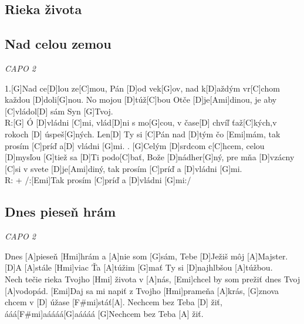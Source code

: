 \documentclass[10pt]{article}
\begin{document}
\begin{Large}
\newpage

\begin{minipage}{\textwidth}
\section{Rieka života}
\subsection{Nad celou zemou}
\textit{CAPO 2}
\begin{multicols*}{2}
\begin{guitar}	
	1.[G]Nad ce[D]lou ze[C]mou, Pán [D]od vek[G]ov,
	nad k[D]aždým vr[C]chom každou [D]doli[G]nou.
	No mojou [D]túž[C]bou Otče [D]je[Ami]dinou,
	je aby [C]vládol[D] sám Syn [G]Tvoj.
	\\
	R:[G] Ó [D]vládni [C]mi, vlád[D]ni s mo[G]cou,
	v čase[D] chvíľ ťaž[C]kých,v rokoch [D] úspeš[G]ných.
	Len[D] Ty si [C]Pán nad [D]tým čo [Emi]mám,
	tak prosím [C]príď a[D] vládni [G]mi.
	. [G]Celým [D]srdcom c[C]hcem, celou [D]mysľou [G]tiež 
	sa [D]Ti podo[C]bať, Bože [D]nádher[G]ný, 
	pre mňa [D]vzácny [C]si v svete [D]je[Ami]diný, 
	tak prosím [C]príď a [D]vládni [G]mi.
	\\
	R: + /:[Emi]Tak prosím [C]príď a [D]vládni [G]mi:/
\end{guitar}
\end{multicols*}
\end{minipage}

\begin{minipage}{\textwidth}
\subsection{Dnes pieseň hrám}
\textit{CAPO 2}
\begin{multicols*}{2}
\begin{guitar}	
	[D]Dnes [A]pieseň [Hmi]hrám a [A]nie som [G]sám, 
	Tebe [D]Ježiš môj [A]Majster.
	[D]A [A]stále [Hmi]viac Ťa [A]túžim [G]mať 
	Ty si [D]najhlbšou [A]túžbou.
	\\
	[Emi]Nech tečie rieka Tvojho [Hmi] života v [A]nás,
	[Emi]chcel by som prežiť dnes Tvoj [A]vodopád.
	[Emi]Daj sa mi napiť z Tvojho [Hmi]prameňa [A]krás,
	[G]znova chcem v [D] úžase [F#mi]stáť[A].
	\columnbreak
	Nechcem bez Teba [D] žiť,
	ááá[F#mi]aáááá[G]aáááá
	[G]Nechcem bez Teba [A] žiť.
\end{guitar}
\end{multicols*}
\end{minipage}


\end{Large}
\end{document}
